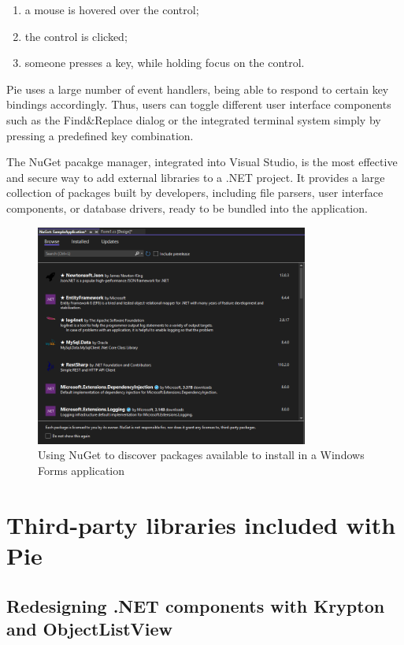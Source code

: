 \begin{enumerate}
  \item a mouse is hovered over the control;
  \item the control is clicked;
  \item someone presses a key, while holding focus on the control. 
\end{enumerate}

Pie uses a large number of event handlers, being able to respond to certain key bindings accordingly. Thus, users can toggle different user interface components such as the Find\&Replace dialog or the integrated terminal system simply by pressing a predefined key combination. 

The NuGet pacakge manager, integrated into Visual Studio, is the most effective and secure way to add external libraries to a .NET project. It provides a large collection of packages built by developers, including file parsers, user interface components, or database drivers, ready to be bundled into the application.

\begin{figure}[H]
\centering
\includegraphics[width=0.8\textwidth]{images/nuget.png}
\caption{Using NuGet to discover packages available to install in a Windows Forms application}
\label{fig:fig2,1.}
\end{figure}

\section{Third-party libraries included with Pie}
\subsection{Redesigning .NET components with Krypton and ObjectListView}

